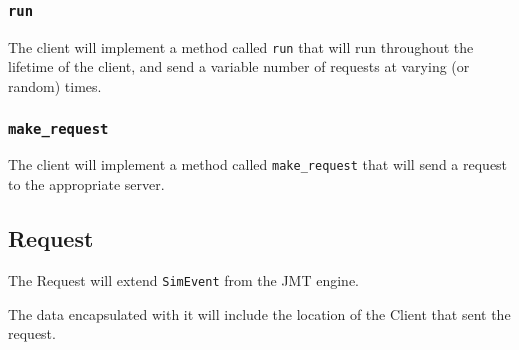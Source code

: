 \documentclass[a4paper]{article}
\begin{document}
\subsubsection{\lstinline{run}}

The client will implement a method called \lstinline{run} that will run throughout the lifetime of the client, and send a variable number of requests at varying (or random) times.

\subsubsection{\lstinline{make_request}}

The client will implement a method called \lstinline{make_request} that will send a request to the appropriate server.

\subsection{Request}%

The Request will extend \lstinline{SimEvent} from the JMT engine. 

The data encapsulated with it will include the location of the Client that sent the request.
\end{document}
